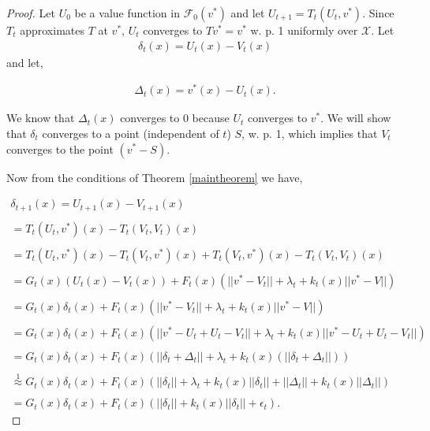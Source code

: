\documentclass[jair, twoside,11pt,theapa]{article}
\begin{document}
\begin{proof}



Let $U_0$ be a value function in $\mathcal{F}_0(v^*)$ and let $U_{t+1} = T_t(U_t, v^*)$. Since $T_t$ approximates $T$ at $v^*$, $U_t$ converges to $T v^* = v^*$ w. p. 1 uniformly over $\mathscr{X}$. 
Let 
\begin{equation}\label{eq:delequation}
    \begin{array}{l}
         \delta_t(x) = U_t(x) - V_t(x)
    \end{array}
\end{equation}
and let, 

\begin{equation}
    \begin{array}{l}
         \Delta_t(x) =  v^*(x) - U_t(x).
    \end{array}
\end{equation}


We know that $\Delta_t(x)$ converges to 0 because $U_t$ converges to $v^*$. We will show that $\delta_t$ converges to a point (independent of $t$) $S$, w. p. 1, which implies that $V_t$ converges to the point $(v^* - S)$. 

Now from the conditions of Theorem \ref{maintheorem} we have,

\begin{equation}\label{deltaeq}
    \begin{array}{l}
        \delta_{t+1}(x) = U_{t+1}(x) - V_{t+1}(x) 
        \\ \\
        = T_t(U_t, v^*)(x) - T_t(V_t, V_t)(x) 
        \\ \\
       =  T_t(U_t, v^*)(x) - T_t(V_t, v^*)(x)  +  T_t(V_t, v^*)(x) - T_t(V_t, V_t)(x) 
        \\ \\
        = G_t(x) (U_t(x) - V_t(x))  +  F_t(x) (|| v^* - V_t|| + \lambda_t + k_t(x) ||v^* - V||)
        \\ \\ 
        = G_t(x) \delta_t(x) +  F_t(x) (|| v^* - V_t|| + \lambda_t + k_t(x) ||v^* - V||)
        \\ \\
        = G_t(x) \delta_t(x)  +
        F_t(x) (|| v^* - U_t + U_t - V_t ||+ \lambda_t  + k_t(x) || v^* - U_t + U_t - V_t ||)
        \\ \\
        = G_t(x) \delta_t(x)  + F_t(x) (||\delta_t + \Delta_t ||+ \lambda_t +   k_t(x) (||\delta_t + \Delta_t ||))
        \\ \\ 
        \overset{1}{\approx}  G_t(x) \delta_t(x)  + F_t(x) (||\delta_t||+ \lambda_t +  k_t(x)||\delta_t|| + ||\Delta_t|| + k_t(x) ||\Delta_t||)
        \\ \\
        = G_t(x) \delta_t(x) + F_t(x) (||\delta_t|| +  k_t(x) ||\delta_t|| + \epsilon_t).
    \end{array}
\end{equation}


\end{proof}
\end{document}
